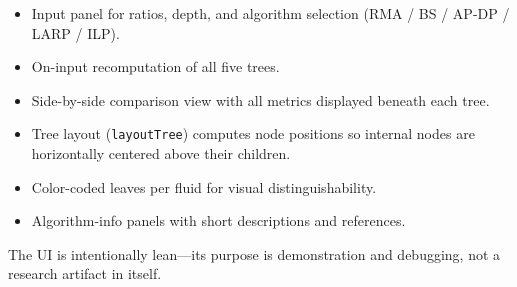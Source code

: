 \begin{itemize}
    \item Input panel for ratios, depth, and algorithm selection (RMA / BS / AP-DP / LARP / ILP).
    \item On-input recomputation of all five trees.
    \item Side-by-side comparison view with all metrics displayed beneath each tree.
    \item Tree layout (\texttt{layoutTree}) computes node positions so internal nodes are horizontally centered above their children.
    \item Color-coded leaves per fluid for visual distinguishability.
    \item Algorithm-info panels with short descriptions and references.
\end{itemize}

The UI is intentionally lean---its purpose is demonstration and debugging, not a research artifact in itself.
